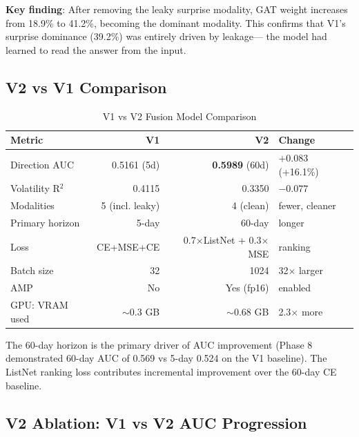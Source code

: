 \documentclass[12pt,a4paper]{article}
\begin{document}
\noindent \textbf{Key finding}: After removing the leaky surprise modality,
GAT weight increases from 18.9\% to 41.2\%, becoming the dominant modality.
This confirms that V1's surprise dominance (39.2\%) was entirely driven by leakage---
the model had learned to read the answer from the input.

\subsection{V2 vs V1 Comparison}

\begin{table}[H]
\centering
\caption{V1 vs V2 Fusion Model Comparison}
\begin{tabular}{lrrl}
\toprule
\textbf{Metric} & \textbf{V1} & \textbf{V2} & \textbf{Change} \\
\midrule
Direction AUC   & 0.5161 (5d)  & \textbf{0.5989} (60d) & $+0.083$ (+16.1\%) \\
Volatility R$^2$ & 0.4115       & 0.3350                & $-0.077$ \\
Modalities      & 5 (incl. leaky) & 4 (clean)          & fewer, cleaner \\
Primary horizon & 5-day        & 60-day                & longer \\
Loss            & CE+MSE+CE    & 0.7$\times$ListNet + 0.3$\times$MSE & ranking \\
Batch size      & 32           & 1024                  & 32$\times$ larger \\
AMP             & No           & Yes (fp16)            & enabled \\
GPU: VRAM used  & $\sim$0.3 GB & $\sim$0.68 GB         & 2.3$\times$ more \\
\bottomrule
\end{tabular}
\end{table}

\noindent The 60-day horizon is the primary driver of AUC improvement (Phase 8
demonstrated 60-day AUC of 0.569 vs 5-day 0.524 on the V1 baseline). The ListNet
ranking loss contributes incremental improvement over the 60-day CE baseline.

\subsection{V2 Ablation: V1 vs V2 AUC Progression}
\end{document}
